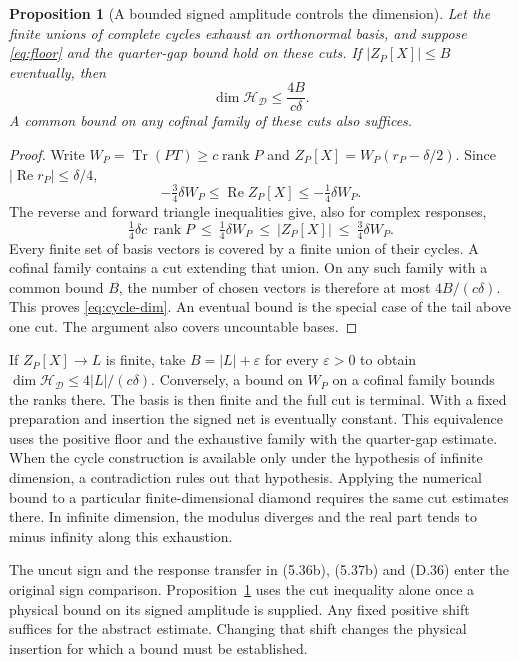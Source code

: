 \documentclass[11pt]{article}
\newcommand{\Tr}{\operatorname{Tr}}
\newcommand{\HH}{\mathcal H_{\mathcal D}}
\DeclareMathOperator{\rank}{rank}
\newtheorem{prop}{Proposition}
\begin{document}
\begin{prop}[A bounded signed amplitude controls the dimension]\label{prop:cycle}
Let the finite unions of complete cycles exhaust an orthonormal basis, and suppose \eqref{eq:floor} and the quarter-gap bound hold on these cuts. If $|Z_P[X]|\le B$ eventually, then
\begin{equation}\label{eq:cycle-dim}
                 \dim\HH\le \frac{4B}{c\delta}.
\end{equation}
A common bound on any cofinal family of these cuts also suffices.
\end{prop}
\begin{proof}
Write $W_P=\Tr(PT)\ge c\rank P$ and $Z_P[X]=W_P(r_P-\delta/2)$. Since $|\operatorname{Re}r_P|\le\delta/4$,
\[
 -\tfrac34\delta W_P\le\operatorname{Re}Z_P[X]\le-\tfrac14\delta W_P .
\]
The reverse and forward triangle inequalities give, also for complex responses,
\begin{equation}\label{eq:cycle-comparison}
 \tfrac14\delta c\,\rank P\ \le\ \tfrac14\delta W_P
     \ \le\ |Z_P[X]|\ \le\ \tfrac34\delta W_P .
\end{equation}
Every finite set of basis vectors is covered by a finite union of their cycles. A cofinal family contains a cut extending that union. On any such family with a common bound $B$, the number of chosen vectors is therefore at most $4B/(c\delta)$. This proves \eqref{eq:cycle-dim}. An eventual bound is the special case of the tail above one cut. The argument also covers uncountable bases.
\end{proof}

If $Z_P[X]\to L$ is finite, take $B=|L|+\varepsilon$ for every $\varepsilon>0$ to obtain $\dim\HH\le4|L|/(c\delta)$. Conversely, a bound on $W_P$ on a cofinal family bounds the ranks there. The basis is then finite and the full cut is terminal. With a fixed preparation and insertion the signed net is eventually constant. This equivalence uses the positive floor and the exhaustive family with the quarter-gap estimate. When the cycle construction is available only under the hypothesis of infinite dimension, a contradiction rules out that hypothesis. Applying the numerical bound to a particular finite-dimensional diamond requires the same cut estimates there. In infinite dimension, the modulus diverges and the real part tends to minus infinity along this exhaustion.

The uncut sign and the response transfer in (5.36b), (5.37b) and (D.36) enter the original sign comparison. Proposition~\ref{prop:cycle} uses the cut inequality alone once a physical bound on its signed amplitude is supplied. Any fixed positive shift suffices for the abstract estimate. Changing that shift changes the physical insertion for which a bound must be established.
\end{document}
